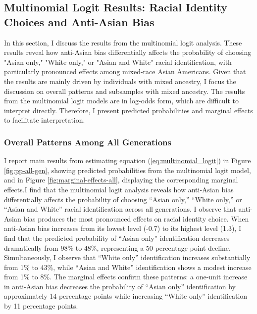 \subsection*{Multinomial Logit Results: Racial Identity Choices and Anti-Asian Bias} \label{sec:multinomial}

In this section, I discuss the results from the multinomial logit analysis. These results reveal how anti-Asian bias differentially affects the probability of choosing "Asian only," "White only," or "Asian and White" racial identification, with particularly pronounced effects among mixed-race Asian Americans. Given that the results are mainly driven by individuals with mixed ancestry, I focus the discussion on overall patterns and subsamples with mixed ancestry. The results from the multinomial logit models are in log-odds form, which are difficult to interpret directly. Therefore, I present predicted probabilities and marginal effects to facilitate interpretation.

\subsubsection*{Overall Patterns Among All Generations}

I report main results from estimating equation (\ref{eq:multinomial_logit}) in Figure \ref{fig:pp-all-gen}, showing predicted probabilities from the multinomial logit model, and in Figure \ref{fig:marginal-effects-all}, displaying the corresponding marginal effects.I find that the multinomial logit analysis reveals how anti-Asian bias differentially affects the probability of choosing ``Asian only,'' ``White only,'' or ``Asian and White'' racial identification across all generations. I observe that anti-Asian bias produces the most pronounced effects on racial identity choice. When anti-Asian bias increases from its lowest level (-0.7) to its highest level (1.3), I find that the predicted probability of ``Asian only'' identification decreases dramatically from 98\% to 48\%, representing a 50 percentage point decline. Simultaneously, I observe that ``White only'' identification increases substantially from 1\% to 43\%, while ``Asian and White'' identification shows a modest increase from 1\% to 8\%. The marginal effects confirm these patterns: a one-unit increase in anti-Asian bias decreases the probability of ``Asian only'' identification by approximately 14 percentage points while increasing ``White only'' identification by 11 percentage points.

